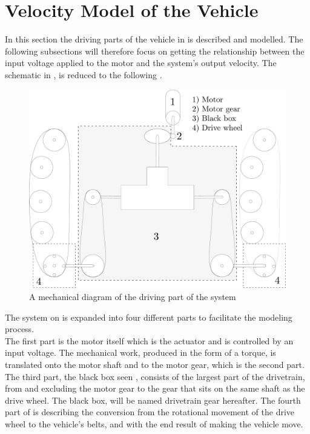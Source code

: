 \section{Velocity Model of the Vehicle}
In this section the driving parts of the vehicle in  is described and modelled. The following subsections will therefore focus on getting the relationship between the input voltage applied to the motor and the system's output velocity. The schematic in ,  is reduced to the following .

\begin{figure}[H]
	\centering
	\includegraphics[scale=0.2]{figures/vehicleDescriptionDriveTrainBlackBox.pdf}
	\caption{A mechanical diagram of the driving part of the system}
	\label{fig:vehicleDescriptionDriveTrainBlackBox}
\end{figure}\vspace{-5mm}

The system on  is expanded into four different parts to facilitate the modeling process.\\
The first part is the motor itself which is the actuator and is controlled by an input voltage. The mechanical work, produced in the form of a torque, is translated onto the motor shaft and to the motor gear, which is the second part.
The third part, the black box seen , consists of the largest part of the drivetrain, from and excluding the motor gear to the gear that sits on the same shaft as the drive wheel. The black box, will be named drivetrain gear hereafter.
The fourth part of  is describing the conversion from the rotational movement of the drive wheel to the vehicle's belts, and with the end result of making the vehicle move.

